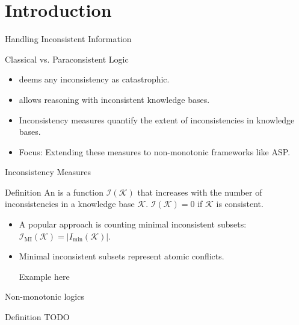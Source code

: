 \section{Introduction}

\begin{frame}{Handling Inconsistent Information}
    \begin{block}{Classical vs. Paraconsistent Logic}
        \begin{itemize}
            \item {} deems any inconsistency as catastrophic.
            \item {} allows reasoning with inconsistent knowledge bases.
        \end{itemize}
    \end{block}
    \begin{itemize}
        \item Inconsistency measures quantify the extent of inconsistencies in knowledge bases.
        \item Focus: Extending these measures to non-monotonic frameworks like ASP.
    \end{itemize}
\end{frame}

\begin{frame}{Inconsistency Measures}
    \begin{block}{Definition}
        An  is a function $\mathcal{I}(\mathcal{K})$ that increases with the number of inconsistencies in a knowledge base $\mathcal{K}$. $\mathcal{I}(\mathcal{K}) = 0$ if $\mathcal{K}$ is consistent.
    \end{block}
    \begin{itemize}
        \item A popular approach is counting minimal inconsistent subsets: $\mathcal{I}_{\text{MI}}(\mathcal{K}) = \left| I_{\min}(\mathcal{K}) \right|$.
        \item Minimal inconsistent subsets represent atomic conflicts.
        \item [Example here]
    \end{itemize}
\end{frame}

\begin{frame}{Non-monotonic logics}
    \begin{block}{Definition}
        TODO
    \end{block}
\end{frame}

